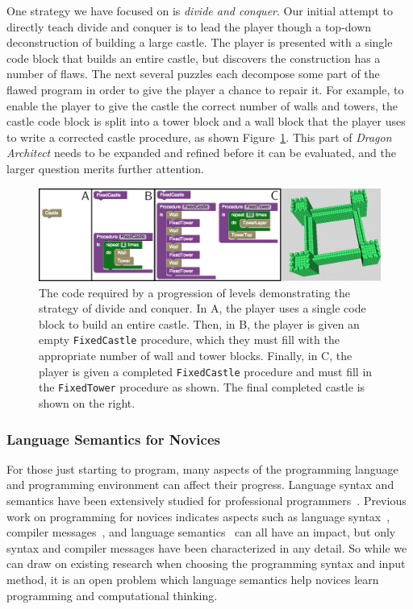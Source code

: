 \documentclass{sig-alternate}
\newcommand{\gametitle}{{\emph{Dragon Architect}}}
\begin{document}
One strategy we have focused on is \emph{divide and conquer}.
Our initial attempt to directly teach divide and conquer is to lead the player though a top-down deconstruction of building a large castle.
The player is presented with a single code block that builds an entire castle, but discovers the construction has a number of flaws. 
The next several puzzles each decompose some part of the flawed program in order to give the player a chance to repair it. 
For example, to enable the player to give the castle the correct number of walls and towers, the castle code block is split into a tower block and a wall block that the player uses to write a corrected castle procedure, as shown Figure~\ref{fig:decomp}. 
This part of \gametitle{} needs to be expanded and refined before it can be evaluated, and the larger question merits further attention. 

\begin{figure}[th!]
  \centering
  \includegraphics[width=\textwidth]{images/decomp-code}
  \caption{The code required by a progression of levels demonstrating the strategy of divide and conquer. In A, the player uses a single code block to build an entire castle. Then, in B, the player is given an empty \texttt{FixedCastle} procedure, which they must fill with the appropriate number of wall and tower blocks. Finally, in C, the player is given a completed \texttt{FixedCastle} procedure and must fill in the \texttt{FixedTower} procedure as shown. The final completed castle is shown on the right.}
  \label{fig:decomp}
\end{figure}

\subsubsection{Language Semantics for Novices}

For those just starting to program, many aspects of the programming language and programming environment can affect their progress. 
Language syntax and semantics have been extensively studied for professional programmers~\cite{hudak1994haskell, kennedy2004defining, delorey2007programming}.
Previous work on programming for novices indicates aspects such as language syntax~\cite{stefik2013syntax}, compiler messages~\cite{nienaltowski2008compiler}, and language semantics~\cite{hoc1990language} can all have an impact, but only syntax and compiler messages have been characterized in any detail. 
So while we can draw on existing research when choosing the programming syntax and input method, it is an open problem which language semantics help novices learn programming and computational thinking.
\end{document}
